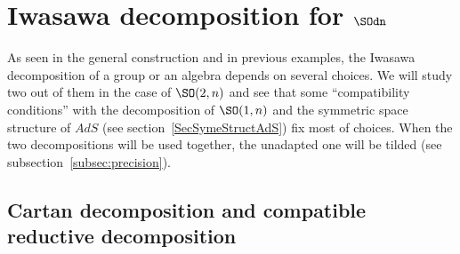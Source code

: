 \section{Iwasawa decomposition for \texorpdfstring{$\SOdn$}{SO2n}} \label{subsecIwasawa_un}

As seen in the general construction and in previous examples, the Iwasawa decomposition of a group or an algebra depends on several choices. We will study two out of them in the case of $\SO(2,n)$ and see that some ``compatibility conditions'' with the decomposition of $\SO(1,n)$ and the symmetric space structure of $AdS$ (see section~\ref{SecSymeStructAdS}) fix most of choices. When the two decompositions will be used together, the unadapted one will be tilded (see subsection~\ref{subsec:precision}).

\subsection{Cartan decomposition and compatible reductive decomposition}		\label{SubSecCartandeuxN}

